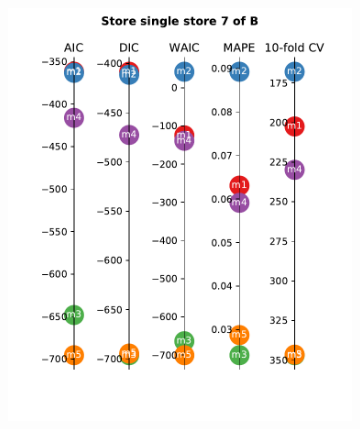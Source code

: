 \documentclass[english, 12pt, a4paper, sci, utf8, a-1b, online]{aaltothesis}
\begin{document}
\begin{figure}[hbt]
\begin{subfigure}[htb]{0.3\textwidth}
	\end{subfigure}
	
	\begin{subfigure}[htb]{0.3\textwidth}
		\centering
		\includegraphics[width=\textwidth]{../plots/metrics/metrics_plot_single_store_7_of_B.pdf}
	\end{subfigure}
	\hfill
	\begin{subfigure}[htb]{0.33\textwidth}
		\centering

\end{subfigure}
\end{figure}
\end{document}
